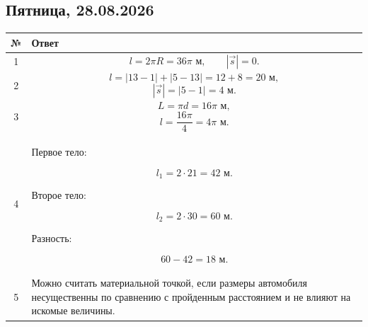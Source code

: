 \documentclass[a4paper,12pt]{article}
\begin{document}

\subsection*{\textcolor{darkaccent}{Пятница, 28.08.2026}}

\begin{center}
\renewcommand{\arraystretch}{1.35}

\begin{tabularx}{\linewidth}{@{}cX@{}}
\toprule
№ & Ответ\\
\midrule

1 &
\[
l=2\pi R=36\pi\text{ м},
\qquad
|\vec{s}|=0.
\]
\\

2 &
\[
l=
|13-1|+|5-13|
=
12+8
=
20\text{ м},
\]
\[
|\vec{s}|=
|5-1|
=
4\text{ м}.
\]
\\

3 &
\[
L=\pi d=16\pi\text{ м},
\]
\[
l=\frac{16\pi}{4}
=
4\pi\text{ м}.
\]
\\

4 &
Первое тело:

\[
l_1=2\cdot21=42\text{ м}.
\]

Второе тело:

\[
l_2=2\cdot30=60\text{ м}.
\]

Разность:

\[
60-42=18\text{ м}.
\]
\\

5 &
Можно считать материальной точкой,
если размеры автомобиля несущественны
по сравнению с пройденным расстоянием
и не влияют на искомые величины.\\

\bottomrule
\end{tabularx}
\end{center}
\end{document}
